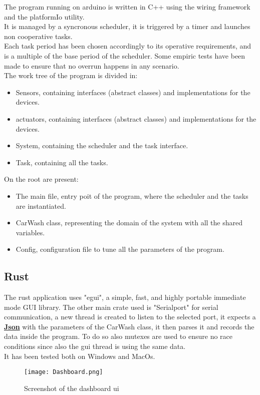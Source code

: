 The program running on arduino is written in C++ using the wiring framework and the platformIo utility.\\
It is managed by a syncronous scheduler, it is triggered by a timer and launches non cooperative tasks.\\
Each task period has been chosen accordingly to its operative requirements, and is a multiple of the base period of the scheduler.
Some empiric tests have been made to ensure that no overrun happens in any scenario.\\
The work tree of the program is divided in:
\begin{itemize}
    \item Sensors, containing interfaces (abstract classes) and implementations for the devices.
    \item actuators, containing interfaces (abstract classes) and implementations for the devices.
    \item System, containing the scheduler and the task interface.
    \item Task, containing all the tasks.
\end{itemize}
On the root are present:
\begin{itemize}
    \item The main file, entry poit of the program, where the scheduler and the tasks are instantiated.
    \item CarWash class, representing the domain of the system with all the shared variables.
    \item Config, configuration file to tune all the parameters of the program.
\end{itemize}
\pagebreak
\subsection{Rust}
The rust application uses "egui", a simple, fast, and highly portable immediate mode GUI library.
The other main crate used is "Serialport" for serial communication, a new thread is created to listen to the selected port,
it expects a \underline{\textbf{Json}} with the parameters of the CarWash class, it then parses it and records the data inside the program.
To do so also mutexes are used to ensure no race conditions since also the gui thread is using the same data.\\
It has been tested both on Windows and MacOs.
\begin{figure}[H]
    \centering
    \texttt{[image: Dashboard.png]}
    \caption{Screenshot of the dashboard ui}
\end{figure}

